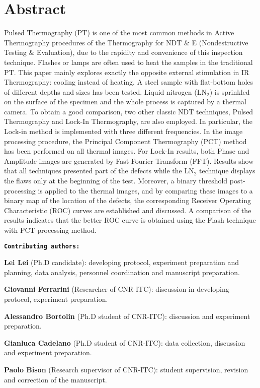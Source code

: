 \section*{Abstract}
Pulsed Thermography (PT) is one of the most common methods in Active Thermography procedures of the Thermography for NDT \& E (Nondestructive Testing \& Evaluation), due to the rapidity and convenience of this inspection technique. Flashes or lamps are often used to heat the samples in the traditional PT. This paper mainly explores exactly the opposite external stimulation in IR Thermography: cooling instead of heating. A steel sample with flat-bottom holes of different depths and sizes has been tested. Liquid nitrogen (LN$_2$) is sprinkled on the surface of the specimen and the whole process is captured by a thermal camera. To obtain a good comparison, two other classic NDT techniques, Pulsed Thermography and Lock-In Thermography, are also employed. In particular, the  Lock-in  method  is  implemented  with  three  different  frequencies.  In  the  image  processing  procedure,  the Principal Component Thermography (PCT) method has been performed on all thermal images. For Lock-In results, both Phase and Amplitude images are generated by Fast Fourier Transform (FFT). Results show that all techniques presented part of the defects while the LN$_2$ technique displays the flaws only at the beginning of the test. Moreover, a binary threshold post-processing is applied to the thermal images, and by comparing these images to a binary map of the location of the defects, the corresponding Receiver Operating Characteristic (ROC) curves are established and discussed. A comparison of the results indicates that the better ROC curve is obtained using the Flash technique with PCT processing method.  

\newpage
\textbf{\texttt{Contributing authors:}}

\textbf{\textsf{Lei Lei}} (Ph.D candidate): developing protocol, experiment preparation and planning, data analysis,  personnel coordination and manuscript preparation.

\textbf{Giovanni Ferrarini} (Researcher of CNR-ITC): discussion in developing protocol, experiment preparation.

\textbf{Alessandro Bortolin} (Ph.D student of CNR-ITC): discussion and experiment preparation.

\textbf{Gianluca Cadelano} (Ph.D student of CNR-ITC): data collection, discussion and experiment preparation.

\textbf{Paolo Bison} (Research supervisor of CNR-ITC): student supervision, revision and correction of the manuscript. 

